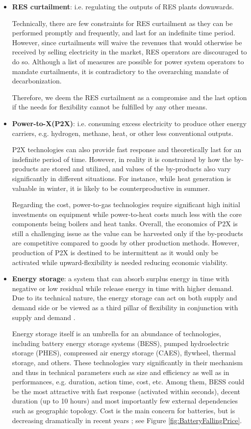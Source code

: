 \begin{itemize}
	\item \textbf{RES curtailment}: i.e. regulating the outputs of RES plants downwards.
	
	Technically, there are few constraints for RES curtailment as they can be performed promptly and frequently, and last for an indefinite time period. However, since curtailments will waive the revenues that would otherwise be received by selling electricity in the market, RES operators are discouraged to do so. Although a list of measures are possible for power system operators to mandate curtailments, it is contradictory to the overarching mandate of decarbonization. 
	
	Therefore, we deem the RES curtailment as a compromise and the last option if the needs for flexibility cannot be fulfilled by any other means.
	
	\item \textbf{Power-to-X(P2X)}: i.e. consuming excess electricity to produce other energy carriers, e.g. hydrogen, methane, heat, or other less conventional outputs.
	
	P2X technologies can also provide fast response and theoretically last for an indefinite period of time. However, in reality it is constrained by how the by-products are stored and utilized, and values of the by-products also vary significantly in different situations. For instance, while heat generation is valuable in winter, it is likely to be counterproductive in summer. 
	
	Regarding the cost, power-to-gas technologies require significant high initial investments on equipment while power-to-heat costs much less with the core components being boilers and heat tanks. Overall, the economics of P2X is still a challenging issue as the value can be harvested only if the by-products are competitive compared to goods by other production methods. However, production of P2X is destined to be intermittent as it would only be activated while upward-flexibility is needed reducing economic viability.
	
	\item \textbf{Energy storage}: a system that can absorb surplus energy in time with negative or low residual while release energy in time with higher demand. Due to its technical nature, the energy storage can act on both supply and demand side or be viewed as a third pillar of flexibility in conjunction with supply and demand \cite{Gunter2016}.
	
	Energy storage itself is an umbrella for an abundance of technologies, including battery energy storage systems (BESS), pumped hydroelectric storage (PHES), compressed air energy storage (CAES), flywheel, thermal storage, and others. These technologies vary significantly in their mechanism and thus in technical parameters such as size and efficiency as well as in performances, e.g. duration, action time, cost, etc. Among them, BESS could be the most attractive with fast response (activated within seconds), decent duration (up to 10 hours) and most importantly few external dependencies such as geographic topology. Cost is the main concern for batteries, but is decreasing dramatically in recent years \cite{Nykvist2015}; see Figure \ref{fig:BatteryFallingPrice}.
	

\end{itemize}
